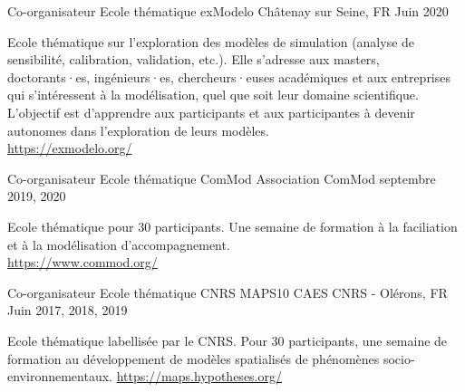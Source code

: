 

\begin{cventries}
    \cventry
      {Co-organisateur} %
      {Ecole thématique exModelo} %
      {Châtenay sur Seine, FR} %
      {Juin 2020} %
      {
        \begin{cvitems} %
          Ecole thématique sur l’exploration des modèles de simulation (analyse de sensibilité, calibration, validation, etc.). Elle s’adresse aux masters, doctorants·es, ingénieurs·es, chercheurs·euses académiques et aux entreprises qui s’intéressent à la modélisation, quel que soit leur domaine scientifique. L’objectif est d’apprendre aux participants et aux participantes à devenir autonomes dans l’exploration de leurs modèles.\\
          \url{https://exmodelo.org/}
          \end{cvitems}
      }

    \cventry
      {Co-organisateur} %
      {Ecole thématique ComMod} %
      {Association ComMod} %
      {septembre 2019, 2020} %
      {
      \begin{cvitems} %
        Ecole thématique pour 30 participants. Une semaine de formation à la faciliation et à la modélisation d'accompagnement.\\
        \url{https://www.commod.org/}
      \end{cvitems}
      }
  \cventry
    {Co-organisateur} %
    {Ecole thématique CNRS MAPS10} %
    {CAES CNRS - Olérons, FR} %
    {Juin 2017, 2018, 2019} %
    {
      \begin{cvitems} %
        Ecole thématique labellisée par le CNRS. Pour 30 participants, une semaine de formation au développement de modèles spatialisés de phénomènes socio-environnementaux. \url{https://maps.hypotheses.org/}
        \end{cvitems}
    }


\end{cventries}
